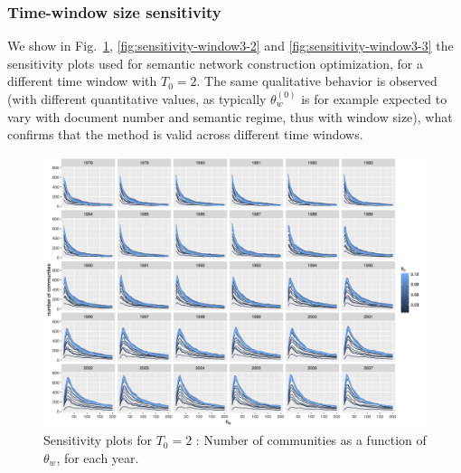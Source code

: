 \documentclass[12pt,twoside,a4paper]{article}
\begin{document}
\subsubsection*{Time-window size sensitivity}


We show in Fig.~\ref{fig:sensitivity-window3-1}, \ref{fig:sensitivity-window3-2} and \ref{fig:sensitivity-window3-3} the sensitivity plots used for semantic network construction optimization, for a different time window with $T_0 = 2$. The same qualitative behavior is observed (with different quantitative values, as typically $\theta_w^{(0)}$ is for example expected to vary with document number and semantic regime, thus with window size), what confirms that the method is valid across different time windows.


\begin{figure}
\centering
\includegraphics[width=\textheight,height=\textwidth,angle=90]{commnum_thetaw_byyears_window3.png}
\caption{Sensitivity plots for $T_0 = 2$ : Number of communities as a function of $\theta_w$, for each year.}
\label{fig:sensitivity-window3-1}
\end{figure}
\end{document}
